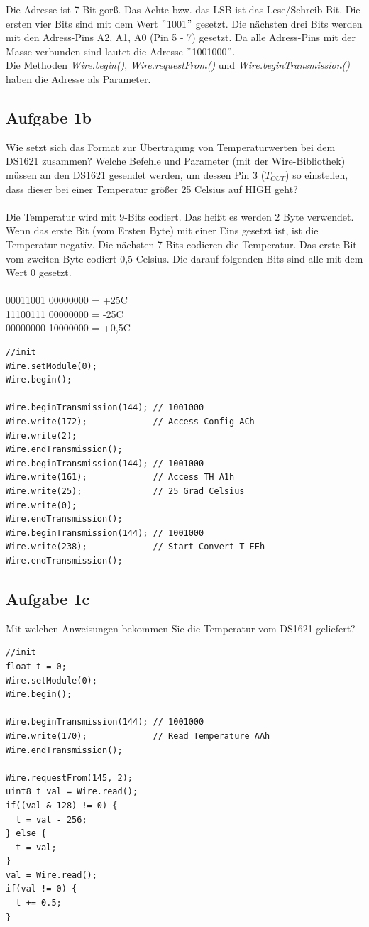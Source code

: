 \noindent Die Adresse ist 7 Bit gor\ss{}. Das Achte bzw. das LSB ist das Lese/Schreib-Bit. Die ersten vier Bits sind mit dem Wert $"$1001$"$ gesetzt. Die nächsten drei Bits werden mit den Adress-Pins A2, A1, A0 (Pin 5 - 7) gesetzt. Da alle Adress-Pins mit der Masse verbunden sind lautet die Adresse $"$1001000$"$.\\
Die Methoden \textit{Wire.begin()}, \textit{Wire.requestFrom()} und \textit{Wire.beginTransmission()} haben die Adresse als Parameter.
\subsection{Aufgabe 1b}
Wie setzt sich das Format zur Übertragung von Temperaturwerten bei dem DS1621 zusammen? Welche Befehle und Parameter (mit der Wire-Bibliothek) müssen an den DS1621 gesendet werden, um dessen Pin 3 ($T_{OUT}$) so einstellen, dass dieser bei einer Temperatur grö\ss{}er 25\textdegree{} Celsius auf HIGH geht?\\ \\
Die Temperatur wird mit 9-Bits codiert. Das hei\ss{}t es werden 2 Byte verwendet. Wenn das erste Bit (vom Ersten Byte) mit einer Eins gesetzt ist, ist die Temperatur negativ. Die nächsten 7 Bits codieren die Temperatur. Das erste Bit vom zweiten Byte codiert 0,5\textdegree{} Celsius. Die darauf folgenden Bits sind alle mit dem Wert 0 gesetzt.\\ \\
00011001 00000000 = +25\textdegree{}C\\
11100111 00000000 = -25\textdegree{}C\\
00000000 10000000 = +0,5\textdegree{}C
\begin{lstlisting}
//init
Wire.setModule(0);
Wire.begin();

Wire.beginTransmission(144); // 1001000
Wire.write(172);             // Access Config ACh
Wire.write(2);
Wire.endTransmission();
Wire.beginTransmission(144); // 1001000
Wire.write(161);             // Access TH A1h
Wire.write(25);              // 25 Grad Celsius
Wire.write(0);
Wire.endTransmission();
Wire.beginTransmission(144); // 1001000
Wire.write(238);             // Start Convert T EEh
Wire.endTransmission();
\end{lstlisting}
\subsection{Aufgabe 1c}
Mit welchen Anweisungen bekommen Sie die Temperatur vom DS1621 geliefert?
\begin{lstlisting}
//init
float t = 0;
Wire.setModule(0);
Wire.begin();

Wire.beginTransmission(144); // 1001000
Wire.write(170);             // Read Temperature AAh
Wire.endTransmission();

Wire.requestFrom(145, 2);
uint8_t val = Wire.read();
if((val & 128) != 0) {
  t = val - 256;
} else {
  t = val;
}
val = Wire.read();
if(val != 0) {
  t += 0.5;
}
\end{lstlisting}
